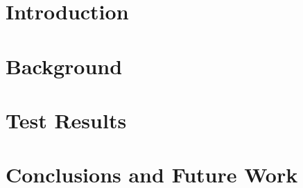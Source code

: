\documentclass{article}
\begin{document}
\clearpage

\vspace*{\fill}
\begin{abstract}
\end{abstract}
\vspace*{\fill}

\clearpage

\tableofcontents

\clearpage

\section{Introduction}


\section{Background}


\section{Test Results}


\section{Conclusions and Future Work}



\patchcmd{\thebibliography}{\section*}{\section}{}{}



\end{document}
